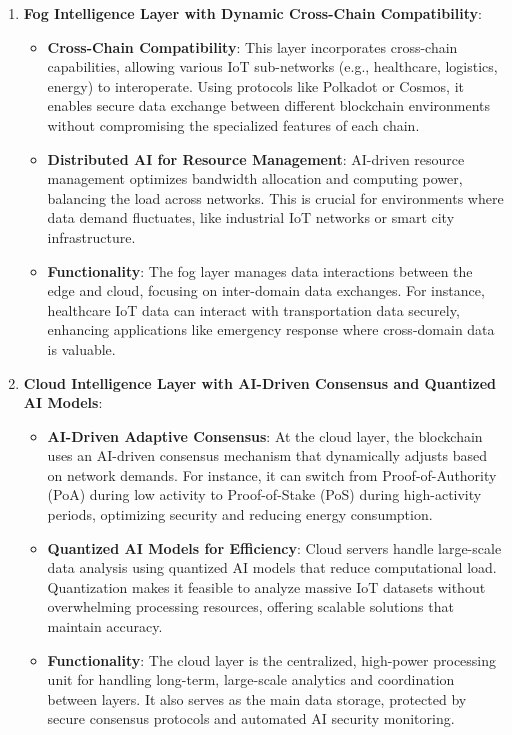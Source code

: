 \documentclass[12pt, oneside]{report}
\begin{document}
\begin{enumerate}
    \item \textbf{Fog Intelligence Layer with Dynamic Cross-Chain Compatibility}:
    \begin{itemize}
        \item \textbf{Cross-Chain Compatibility}: This layer incorporates cross-chain capabilities, allowing various IoT sub-networks (e.g., healthcare, logistics, energy) to interoperate. Using protocols like Polkadot or Cosmos, it enables secure data exchange between different blockchain environments without compromising the specialized features of each chain.
        \item \textbf{Distributed AI for Resource Management}: AI-driven resource management optimizes bandwidth allocation and computing power, balancing the load across networks. This is crucial for environments where data demand fluctuates, like industrial IoT networks or smart city infrastructure.
        \item \textbf{Functionality}: The fog layer manages data interactions between the edge and cloud, focusing on inter-domain data exchanges. For instance, healthcare IoT data can interact with transportation data securely, enhancing applications like emergency response where cross-domain data is valuable.
    \end{itemize}

    \item \textbf{Cloud Intelligence Layer with AI-Driven Consensus and Quantized AI Models}:
    \begin{itemize}
        \item \textbf{AI-Driven Adaptive Consensus}: At the cloud layer, the blockchain uses an AI-driven consensus mechanism that dynamically adjusts based on network demands. For instance, it can switch from Proof-of-Authority (PoA) during low activity to Proof-of-Stake (PoS) during high-activity periods, optimizing security and reducing energy consumption.
        \item \textbf{Quantized AI Models for Efficiency}: Cloud servers handle large-scale data analysis using quantized AI models that reduce computational load. Quantization makes it feasible to analyze massive IoT datasets without overwhelming processing resources, offering scalable solutions that maintain accuracy.
        \item \textbf{Functionality}: The cloud layer is the centralized, high-power processing unit for handling long-term, large-scale analytics and coordination between layers. It also serves as the main data storage, protected by secure consensus protocols and automated AI security monitoring.
    \end{itemize}


\end{enumerate}
\end{document}
